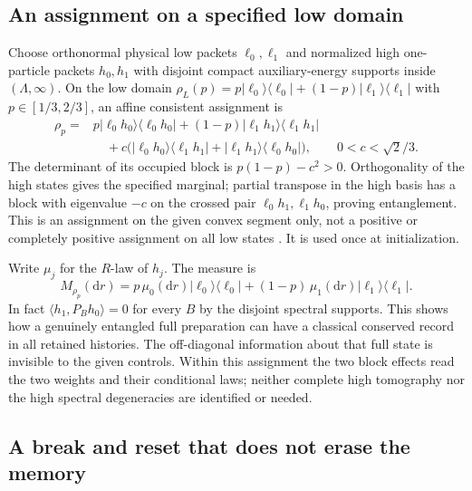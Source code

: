 \documentclass[11pt]{article}
\newcommand{\dd}{\mathrm d}
\newcommand{\ketbra}[2]{|#1\rangle\langle #2|}
\begin{document}
\subsection{An assignment on a specified low domain}

Choose orthonormal physical low packets \(\ell_0,\ell_1\) and normalized high one-particle packets \(h_0,h_1\) with disjoint compact auxiliary-energy supports inside \((\Lambda,\infty)\). On the low domain
\(\rho_L(p)=p\ketbra{\ell_0}{\ell_0}+(1-p)\ketbra{\ell_1}{\ell_1}\) with \(p\in[1/3,2/3]\), an affine consistent assignment is
\begin{align}
 \rho_p={}&p\ketbra{\ell_0h_0}{\ell_0h_0}
   +(1-p)\ketbra{\ell_1h_1}{\ell_1h_1}\nonumber\\
 &\quad+c\bigl(\ketbra{\ell_0h_0}{\ell_1h_1}
              +\ketbra{\ell_1h_1}{\ell_0h_0}\bigr),
 \qquad 0<c<\sqrt2/3 .
 \label{eq:assignment}
\end{align}
The determinant of its occupied block is \(p(1-p)-c^2>0\). Orthogonality of the high states gives the specified marginal; partial transpose in the high basis has a block with eigenvalue \(-c\) on the crossed pair \(\ell_0h_1,\ell_1h_0\), proving entanglement. This is an assignment on the given convex segment only, not a positive or completely positive assignment on all low states \cite{Pechukas}. It is used once at initialization.

Write \(\mu_j\) for the \(R\)-law of \(h_j\). The measure is
\begin{equation}
 M_{\rho_p}(\dd r)=p\,\mu_0(\dd r)\ketbra{\ell_0}{\ell_0}
 +(1-p)\,\mu_1(\dd r)\ketbra{\ell_1}{\ell_1}.
 \label{eq:assignmentmeasure}
\end{equation}
In fact \(\langle h_1,P_B h_0\rangle=0\) for every \(B\) by the disjoint spectral supports. This shows how a genuinely entangled full preparation can have a classical conserved record in all retained histories. The off-diagonal information about that full state is invisible to the given controls. Within this assignment the two block effects read the two weights and their conditional laws; neither complete high tomography nor the high spectral degeneracies are identified or needed.

\subsection{A break and reset that does not erase the memory}
\end{document}
